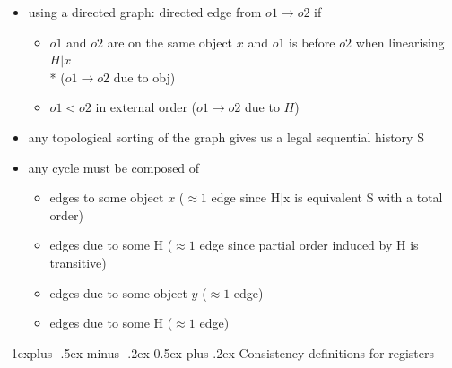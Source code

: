 \documentclass[10pt, landscape]{article}
\makeatletter
\renewcommand{\subsection}{\@startsection{subsection}{2}{0mm}%
  {-1explus -.5ex minus -.2ex}%
  {0.5ex plus .2ex}%
{\normalfont\normalsize\bfseries}}
\makeatother
\begin{document}
\begin{multicols*}{3}
  \begin{itemize}
    \item using a directed graph: directed edge from $o1 \rightarrow o2$ if
      \begin{itemize}
        \item $o1$ and $o2$ are on the same object $x$ and $o1$ is before $o2$ when linearising $H \vert x$ \\* ($o1\rightarrow o2$ due to obj)
        \item $o1 < o2$ in external order ($o1\rightarrow o2$ due to $H$)
      \end{itemize}
    \item any topological sorting of the graph gives us a legal sequential history S
    \item any cycle must be composed of
      \begin{itemize}
        \item edges to some object $x$ ($\approx 1$ edge since H|x is equivalent S with a total order)
        \item edges due to some H ($\approx 1$ edge since partial order induced by H is transitive)
        \item edges due to some object $y$ ($\approx 1$ edge)
        \item edges due to some H ($\approx 1$ edge)
      \end{itemize}
  \end{itemize}

  \subsection{Consistency definitions for registers}


\end{multicols*}
\end{document}
